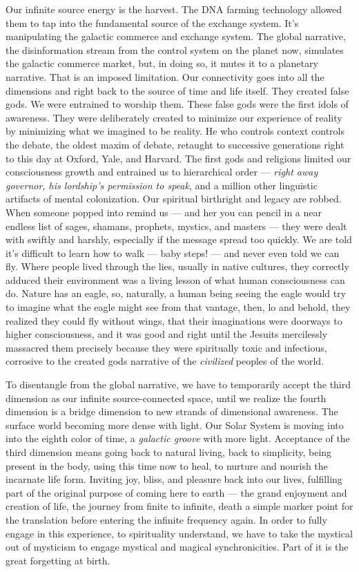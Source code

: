 Our infinite source energy is the harvest. The DNA farming technology
allowed them to tap into the fundamental source of the exchange system.
It's manipulating the galactic commerce and exchange system. The global
narrative, the disinformation stream from the control system on the
planet now, simulates the galactic commerce market, but, in doing so, it
mutes it to a planetary narrative. That is an imposed limitation. Our
connectivity goes into all the dimensions and right back to the source
of time and life itself. They created false gods. We were entrained to
worship them. These false gods were the first idols of awareness. They
were deliberately created to minimize our experience of reality by
minimizing what we imagined to be reality. He who controls context
controls the debate, the oldest maxim of debate, retaught to successive
generations right to this day at Oxford, Yale, and Harvard. The first
gods and religions limited our consciousness growth and entrained us to
hierarchical order --- \emph{right away governor, his lordship's
permission to speak}, and a million other linguistic artifacts of mental
colonization. Our spiritual birthright and legacy are robbed. When
someone popped into remind us --- and her you can pencil in a near
endless list of sages, shamans, prophets, mystics, and masters --- they
were dealt with swiftly and harshly, especially if the message spread
too quickly. We are told it's difficult to learn how to walk --- baby
steps! --- and never even told we can fly. Where people lived through
the lies, usually in native cultures, they correctly adduced their
environment was a living lesson of what human consciousness can do.
Nature has an eagle, so, naturally, a human being seeing the eagle would
try to imagine what the eagle might see from that vantage, then, lo and
behold, they realized they could fly without wings, that their
imaginations were doorways to higher consciousness, and it was good and
right until the Jesuits mercilessly massacred them precisely because
they were spiritually toxic and infectious, corrosive to the created
gods narrative of the \emph{civilized} peoples of the world.

To disentangle from the global narrative, we have to temporarily accept
the third dimension as our infinite source-connected space, until we
realize the fourth dimension is a bridge dimension to new strands of
dimensional awareness. The surface world becoming more dense with light.
Our Solar System is moving into into the eighth color of time, a
\emph{galactic groove} with more light. Acceptance of the third
dimension means going back to natural living, back to simplicity, being
present in the body, using this time now to heal, to nurture and nourish
the incarnate life form. Inviting joy, bliss, and pleasure back into our
lives, fulfilling part of the original purpose of coming here to earth
--- the grand enjoyment and creation of life, the journey from finite to
infinite, death a simple marker point for the translation before
entering the infinite frequency again. In order to fully engage in this
experience, to spirituality understand, we have to take the mystical out
of mysticism to engage mystical and magical synchronicities. Part of it
is the great forgetting at birth.

